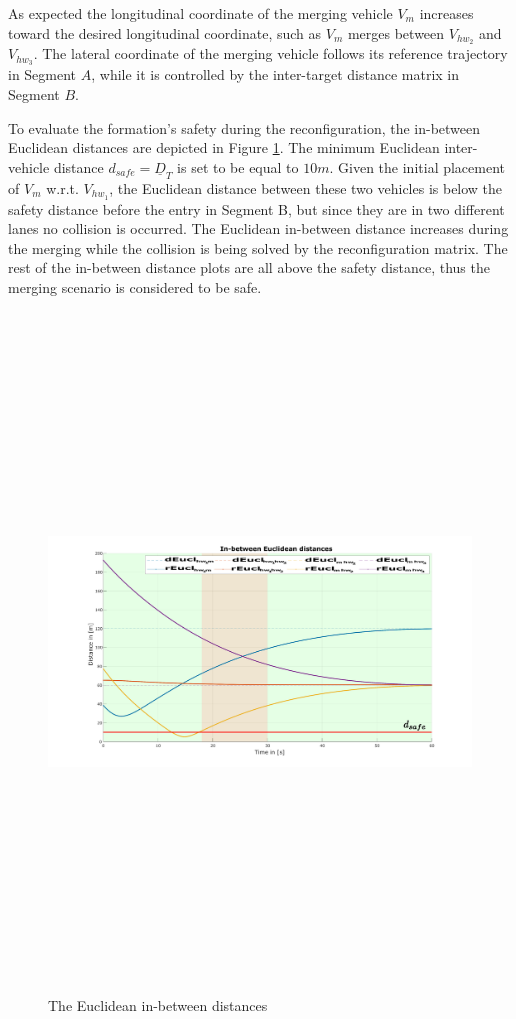 As expected the longitudinal coordinate of the merging vehicle $V_m$ increases toward the desired longitudinal coordinate, such as $V_m$ merges between $V_{hw_2}$ and $V_{hw_3}$. The lateral coordinate of the merging vehicle follows its reference trajectory in Segment $A$, while it is controlled by the inter-target distance matrix in Segment $B$. 


To evaluate the formation's safety during the reconfiguration, the in-between Euclidean distances are depicted in Figure \ref{fig:FRA-OCS:distances}. The minimum Euclidean inter-vehicle distance ${d}_{safe}=\underline{D}_T$ is set to be equal to $10m$. Given the initial placement of $V_m$ w.r.t. $V_{hw_1}$, the Euclidean distance between these two vehicles is below the safety distance before the entry in Segment B, but since they are in two different lanes no collision is occurred. The Euclidean in-between distance increases during the merging while the collision is being solved by the reconfiguration matrix. The rest of the in-between distance plots are all above the safety distance, thus the merging scenario is considered to be safe. 



        \begin{figure}[!h]
        \centering 
        \includegraphics[width=11.5cm,height=18cm,keepaspectratio]{chapters/Chapitre_5/Figures/FRA-OCS/distances.pdf}
        \caption{The Euclidean in-between distances}
        \label{fig:FRA-OCS:distances}
        \end{figure}

